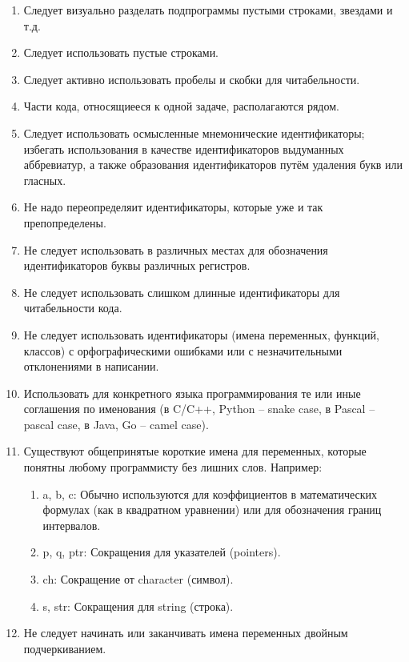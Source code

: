 \documentclass[a4paper, 12pt]{article}
\begin{document}
\begin{enumerate}[start=13]
    \item Следует визуально разделать подпрограммы пустыми строками, звездами и т.д.
    \item Следует использовать пустые строками.
    \item Следует активно использовать пробелы и скобки для читабельности.
    \item Части кода, относящиееся к одной задаче, располагаются рядом.
    \item Следует использовать осмысленные мнемонические идентификаторы; избегать использования в качестве идентификаторов выдуманных аббревиатур, а также образования идентификаторов путём удаления букв или гласных.
    \item Не надо переопределяит идентификаторы, которые уже и так препопределены.
    \item Не следует использовать в различных местах для обозначения идентификаторов буквы различных регистров.
    \item Не следует использовать слишком длинные идентификаторы для читабельности кода.
    \item Не следует использовать идентификаторы (имена переменных, функций, классов) с орфографическими ошибками или с незначительными отклонениями в написании.
    \item Использовать для конкретного языка программирования те или иные соглашения по именования (в C/C++, Python -- snake case, в Pascal -- pascal case, в Java, Go -- camel case).
    \item Существуют общепринятые короткие имена для переменных, которые понятны любому программисту без лишних слов. Например: \begin{enumerate}
        \item[\textbigcircle] a, b, c: Обычно используются для коэффициентов в математических формулах (как в квадратном уравнении) или для обозначения границ интервалов.
        \item[\textbigcircle] p, q, ptr: Сокращения для указателей (pointers).
        \item[\textbigcircle] ch: Сокращение от character (символ).
        \item[\textbigcircle] s, str: Сокращения для string (строка).
    \end{enumerate}
    \item Не следует начинать или заканчивать имена переменных двойным подчеркиванием.
\end{enumerate}
\end{document}
